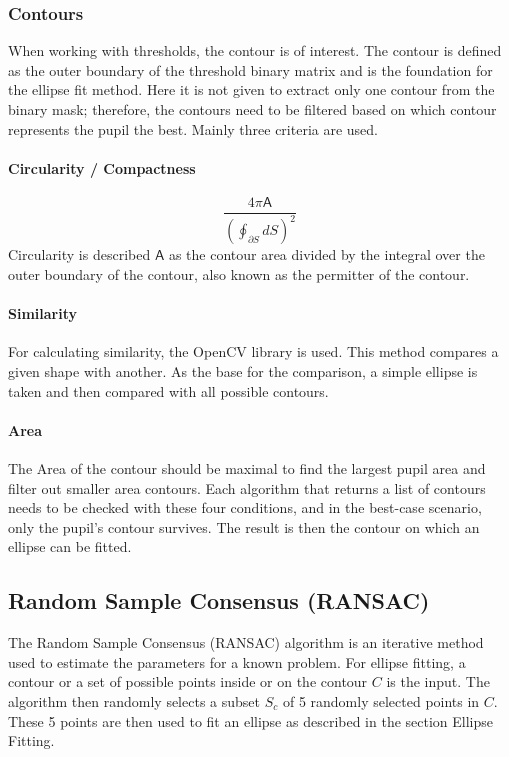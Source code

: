 \subsubsection{Contours}
When working with thresholds, the contour is of interest. The contour is defined as the outer boundary of the threshold binary matrix and is the foundation for the ellipse fit method. 
Here it is not given to extract only one contour from the binary mask; therefore, the contours need to be filtered based on which contour represents the pupil the best. 
Mainly three criteria are used. 

\paragraph{Circularity / Compactness}
\begin{equation}
    \frac{4\pi\mathsf{A} }{(\oint_{\partial S} dS)^2}
\end{equation}
Circularity is described $\mathsf{A} $ as the contour area divided by the integral over the outer boundary of the contour, also known as the permitter of the contour.

\paragraph{Similarity }
For calculating similarity, the OpenCV library is used. This method compares a given shape with another. As the base for the comparison, a simple ellipse is taken and then compared with all possible contours.

\paragraph{Area}
The Area of the contour should be maximal to find the largest pupil area and filter out smaller area contours. 
Each algorithm that returns a list of contours needs to be checked with these four conditions, and in the best-case scenario, only the pupil's contour survives. The result is then the contour on which an ellipse can be fitted. 
\newpage
\subsection{Random Sample Consensus (RANSAC) }
\label{sus:ransac}
The Random Sample Consensus (RANSAC) \cite{derpanis_overview_nodate} algorithm is an iterative method used to estimate the parameters for a known problem. For ellipse fitting, a contour or a set of possible points inside or on the contour $C$ is the input. The algorithm then randomly selects a subset $S_c$ of 5 randomly selected points in $C$. 
These 5 points are then used to fit an ellipse as described in the section Ellipse Fitting.

